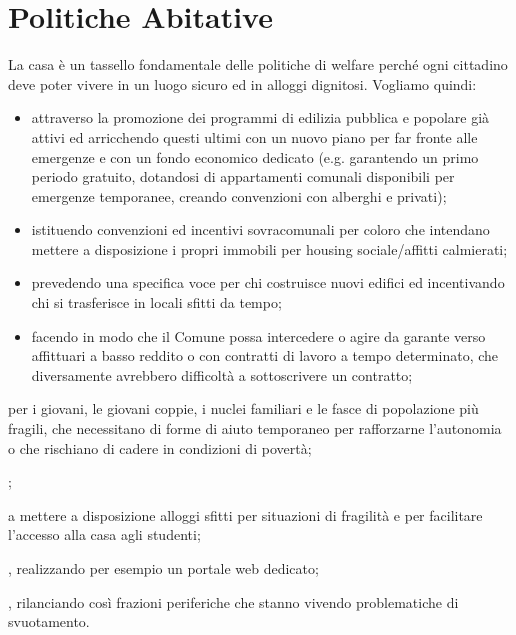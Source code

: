 \section{Politiche Abitative}
La casa è un tassello fondamentale delle politiche di welfare perché ogni cittadino deve poter vivere in un luogo sicuro ed in alloggi dignitosi.
Vogliamo quindi:

\begin{itemize}
  \item attraverso la promozione dei programmi di edilizia pubblica e popolare già attivi ed arricchendo questi ultimi con un nuovo piano per far fronte alle emergenze e con un fondo economico dedicato (e.g. garantendo un primo periodo gratuito, dotandosi di appartamenti comunali disponibili per emergenze temporanee, creando convenzioni con alberghi e privati);
  \item istituendo convenzioni ed incentivi sovracomunali per coloro che intendano mettere a disposizione i propri immobili per housing sociale/affitti calmierati;
  \item prevedendo una specifica voce per chi costruisce nuovi edifici ed incentivando chi si trasferisce in locali sfitti da tempo;
  \item facendo in modo che il Comune possa intercedere o agire da garante verso affittuari a basso reddito o con contratti di lavoro a  tempo determinato, che diversamente avrebbero difficoltà a sottoscrivere un contratto;
\end{itemize}

per i giovani, le giovani coppie, i nuclei familiari e le fasce di popolazione più fragili, che necessitano di forme di aiuto temporaneo per rafforzarne l'autonomia o che rischiano di cadere in condizioni di povertà;

;

 a mettere a disposizione alloggi sfitti per situazioni di fragilità e per facilitare l'accesso alla casa agli studenti;

, realizzando per esempio un portale web dedicato;

, rilanciando così frazioni periferiche che stanno vivendo problematiche di svuotamento.
